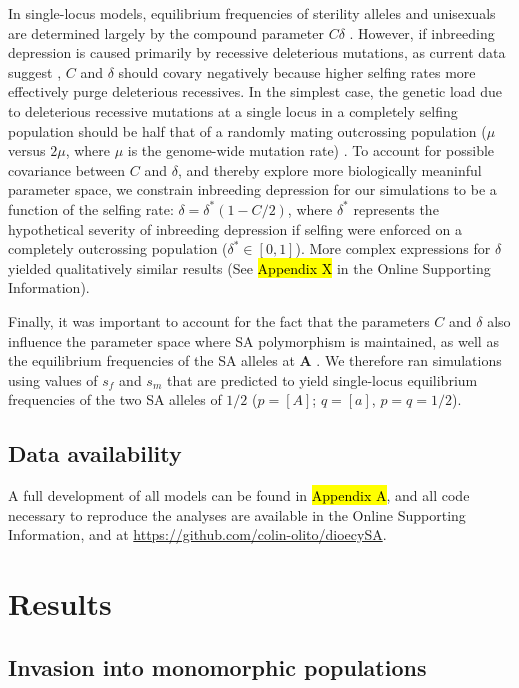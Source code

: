\documentclass[9pt,twocolumn,twoside,lineno]{gsajnl}
\begin{document}
In single-locus models, equilibrium frequencies of sterility alleles and unisexuals are determined largely by the compound parameter $C \delta$ \citep{Charlesworth1978a}. However, if inbreeding depression is caused primarily by recessive deleterious mutations, as current data suggest \citep{Charlesworth2009}, $C$ and $\delta$ should covary negatively because higher selfing rates more effectively purge deleterious recessives. In the simplest case, the genetic load due to deleterious recessive mutations at a single locus in a completely selfing population should be half that of a randomly mating outcrossing population ($\mu$ versus $2 \mu$, where $\mu$ is the genome-wide mutation rate) \citep{OhtaCockerham1974}. To account for possible covariance between $C$ and $\delta$, and thereby explore more biologically meaninful parameter space, we constrain inbreeding depression for our simulations to be a function of the selfing rate: $\delta = \delta^\ast(1 - C/2)$, where $\delta^\ast$ represents the hypothetical severity of inbreeding depression if selfing were enforced on a completely outcrossing population ($\delta^\ast \in [0,1]$). More complex expressions for $\delta$ yielded qualitatively similar results (See \hl{Appendix X} in the Online Supporting Information). 

Finally, it was important to account for the fact that the parameters $C$ and $\delta$ also influence the parameter space where SA polymorphism is maintained, as well as the equilibrium frequencies of the SA alleles at $\mathbf{A}$ \citep{JordanConnallon2014,Olito2017}. We therefore ran simulations using values of $s_f$ and $s_m$ that are predicted to yield single-locus equilibrium frequencies of the two SA alleles of $1/2$ ($p = [A]$; $q = [a]$, $p=q=1/2$).



\subsection{Data availability}
A full development of all models can be found in \hl{Appendix A}, and all code necessary to reproduce the analyses are available in the Online Supporting Information, and at \url{https://github.com/colin-olito/dioecySA}.


\section{Results}

\subsection{Invasion into monomorphic populations}
\end{document}
